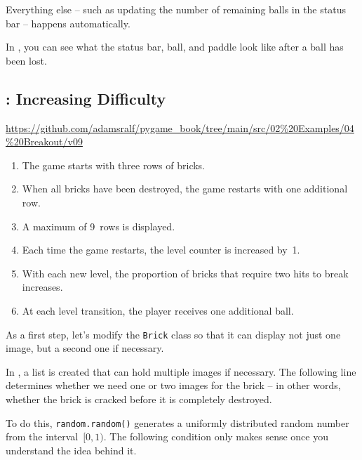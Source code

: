 Everything else -- such as updating the number of remaining balls in the status bar -- happens automatically.


In , you can see what the status bar, ball, and paddle look like after a ball has been lost.

\subsection{: Increasing Difficulty}

\begin{diskbox}
	\url{https://github.com/adamsralf/pygame_book/tree/main/src/02%20Examples/04%20Breakout/v09}
\end{diskbox}

\begin{enumerate}
	\item The game starts with three rows of bricks.
	\item When all bricks have been destroyed, the game restarts with one additional row.
	\item A maximum of 9~rows is displayed.
	\item Each time the game restarts, the level counter is increased by~1.
	\item With each new level, the proportion of bricks that require two hits to break increases.
	\item At each level transition, the player receives one additional ball.
\end{enumerate}
\er

As a first step, let's modify the \texttt{Brick} class so that it can display not just one image, but a second one if necessary.

In , a list is created that can hold multiple images if necessary. The following line determines whether we need one or two images for the brick -- in other words, whether the brick is cracked before it is completely destroyed.

To do this, \texttt{random.random()} generates a uniformly distributed random number from the interval~$[0, 1)$. The following condition only makes sense once you understand the idea behind it.

